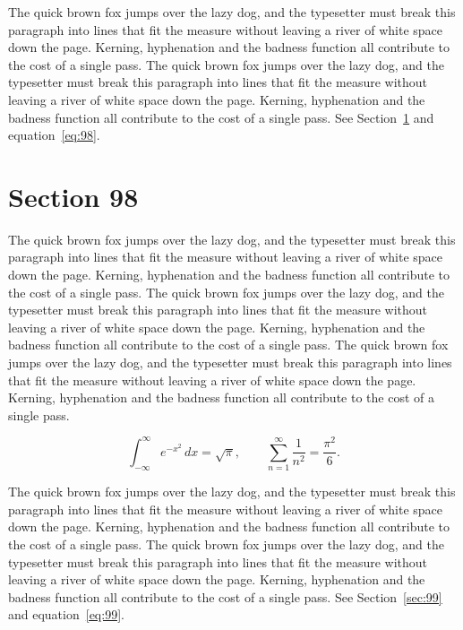 \documentclass{article}
\begin{document}
The quick brown fox jumps over the lazy dog, and the typesetter must break this paragraph into lines that fit the measure without leaving a river of white space down the page. Kerning, hyphenation and the badness function all contribute to the cost of a single pass. The quick brown fox jumps over the lazy dog, and the typesetter must break this paragraph into lines that fit the measure without leaving a river of white space down the page. Kerning, hyphenation and the badness function all contribute to the cost of a single pass. 
See Section~\ref{sec:98} and equation~\eqref{eq:98}.
\section{Section 98}
\label{sec:98}
The quick brown fox jumps over the lazy dog, and the typesetter must break this paragraph into lines that fit the measure without leaving a river of white space down the page. Kerning, hyphenation and the badness function all contribute to the cost of a single pass. The quick brown fox jumps over the lazy dog, and the typesetter must break this paragraph into lines that fit the measure without leaving a river of white space down the page. Kerning, hyphenation and the badness function all contribute to the cost of a single pass. The quick brown fox jumps over the lazy dog, and the typesetter must break this paragraph into lines that fit the measure without leaving a river of white space down the page. Kerning, hyphenation and the badness function all contribute to the cost of a single pass. 

\begin{equation}\label{eq:98}
\int_{-\infty}^{\infty} e^{-x^{2}}\,dx = \sqrt{\pi}, \qquad
\sum_{n=1}^{\infty} \frac{1}{n^{2}} = \frac{\pi^{2}}{6}.
\end{equation}

The quick brown fox jumps over the lazy dog, and the typesetter must break this paragraph into lines that fit the measure without leaving a river of white space down the page. Kerning, hyphenation and the badness function all contribute to the cost of a single pass. The quick brown fox jumps over the lazy dog, and the typesetter must break this paragraph into lines that fit the measure without leaving a river of white space down the page. Kerning, hyphenation and the badness function all contribute to the cost of a single pass. 
See Section~\ref{sec:99} and equation~\eqref{eq:99}.
\end{document}
